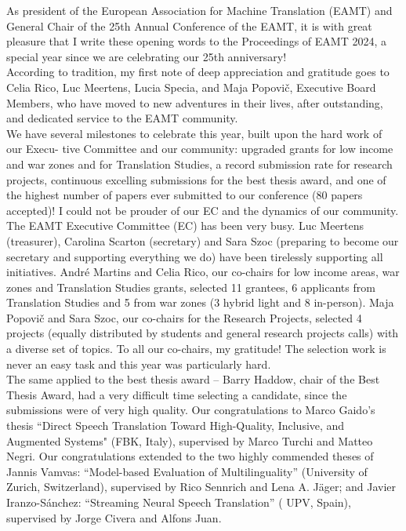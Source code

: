 As president of the European Association for Machine Translation (EAMT) and General Chair of the 25th Annual Conference of the EAMT, it is with great pleasure that I write these opening words to the Proceedings of EAMT 2024, a special year since we are celebrating our 25th anniversary!
\\

According to tradition, my first note of deep appreciation and gratitude goes to Celia Rico, Luc Meertens, Lucia Specia, and Maja Popovič, Executive Board Members, who have moved to new adventures in their lives, after outstanding, and dedicated service to the EAMT community.
\\

We have several milestones to celebrate this year, built upon the hard work of our Execu- tive Committee and our community: upgraded grants for low income and war zones and for Translation Studies, a record submission rate for research projects, continuous excelling submissions for the best thesis award, and one of the highest number of papers ever submitted to our conference (80 papers accepted)! I could not be prouder of our EC and the dynamics of our community.
\\

The EAMT Executive Committee (EC) has been very busy. Luc Meertens (treasurer), Carolina Scarton (secretary) and Sara Szoc (preparing to become our secretary and supporting everything we do) have been tirelessly supporting all initiatives. André Martins and Celia Rico, our co-chairs for low income areas, war zones and Translation Studies grants, selected 11 grantees, 6 applicants from Translation Studies and 5 from war zones (3 hybrid light and 8 in-person). Maja Popovič and Sara Szoc, our co-chairs for the Research Projects, selected 4  projects (equally distributed by students and general research projects calls) with a diverse set of topics. To all our co-chairs, my gratitude! The selection work is never an easy task and this year was particularly hard. 
\\

The same applied to the best thesis award –  Barry Haddow, chair of the Best Thesis Award, had a very difficult time selecting a candidate, since the submissions were of very high quality. Our congratulations to Marco Gaido's thesis “Direct Speech Translation Toward High-Quality, Inclusive, and Augmented Systems" (FBK, Italy), supervised by Marco Turchi and Matteo Negri. Our congratulations extended to the two highly commended theses of Jannis Vamvas: “Model-based Evaluation of Multilinguality” (University of Zurich, Switzerland), supervised by Rico Sennrich and Lena A. Jäger; and Javier Iranzo-Sánchez: “Streaming Neural Speech Translation” ( UPV, Spain), supervised by Jorge Civera and Alfons Juan. 
\\

